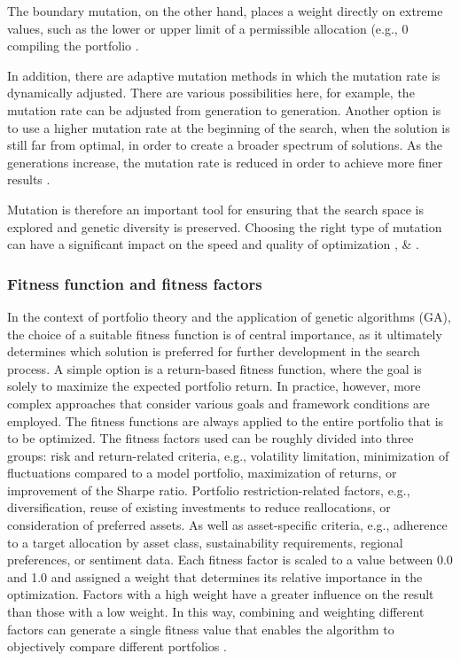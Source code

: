 \documentclass{agasthesis}
\begin{document}
The boundary mutation, on the other hand, places a weight directly on extreme values, such as the lower or upper limit of a 
permissible allocation (e.g., 0%
compiling the portfolio \cite[p. 181]{rajakumar_static_2013}.

In addition, there are adaptive mutation methods in which the mutation rate is dynamically adjusted. There are various possibilities here, 
for example, the mutation rate can be adjusted from generation to generation. Another option is to use a higher mutation rate at the beginning 
of the search, when the solution is still far from optimal, in order to create a broader spectrum of solutions. As the generations increase, 
the mutation rate is reduced in order to achieve more finer results \cite[p. 181]{rajakumar_static_2013}.

Mutation is therefore an important tool for ensuring that the search space is explored and genetic diversity is preserved. 
Choosing the right type of mutation can have a significant impact on the speed and quality of optimization \cite{rajakumar_static_2013}, \cite[p. 8 & 129-130]{melanie_introduction_1999} & \cite[p. 471]{kalayci_review_2017}.


\subsubsection{Fitness function and fitness factors}
In the context of portfolio theory and the application of genetic algorithms (GA), the choice of a suitable fitness function is of central importance, 
as it ultimately determines which solution is preferred for further development in the search process. A simple option is a return-based fitness function, 
where the goal is solely to maximize the expected portfolio return. In practice, however, more complex approaches that consider various goals and framework 
conditions are employed. The fitness functions are always applied to the entire portfolio that is to be optimized. The fitness factors used can be roughly divided 
into three groups: risk and return-related criteria, e.g., volatility limitation, minimization of fluctuations compared to a model portfolio, maximization of returns, 
or improvement of the Sharpe ratio. Portfolio restriction-related factors, e.g., diversification, reuse of existing investments to reduce reallocations, or consideration 
of preferred assets. As well as asset-specific criteria, e.g., adherence to a target allocation by asset class, sustainability requirements, regional preferences, or sentiment data. 
Each fitness factor is scaled to a value between 0.0 and 1.0 and assigned a weight that determines its relative importance in the optimization. Factors with a high weight have a greater 
influence on the result than those with a low weight. In this way, combining and weighting different factors can generate a single fitness value that enables the algorithm to objectively 
compare different portfolios \cite[p. 206-207]{soldatos_big_2022}.
\end{document}
